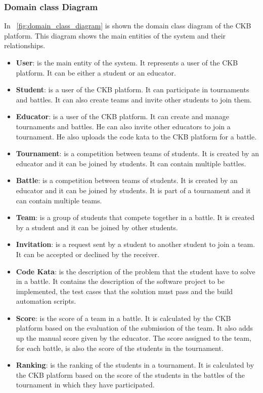 \subsubsection{Domain class Diagram}
In \figurename~\ref{fig:domain_class_diagram} is shown the domain class diagram of the CKB platform. This diagram shows the main entities of the system and their relationships.
\begin{itemize}
    \item \textbf{User}: is the main entity of the system. It represents a user of the CKB platform. It can be either a student or an educator.
    \item \textbf{Student}: is a user of the CKB platform. It can participate in tournaments and battles. It can also create teams and invite other students to join them.
    \item \textbf{Educator}: is a user of the CKB platform. It can create and manage tournaments and battles. He can also invite other educators to join a tournament. He also uploads the code kata to the CKB platform for a battle.
    \item \textbf{Tournament}: is a competition between teams of students. It is created by an educator and it can be joined by students. It can contain multiple battles.
    \item \textbf{Battle}: is a competition between teams of students. It is created by an educator and it can be joined by students. It is part of a tournament and it can contain multiple teams.
    \item \textbf{Team}: is a group of students that compete together in a battle. It is created by a student and it can be joined by other students.
    \item \textbf{Invitation}: is a request sent by a student to another student to join a team. It can be accepted or declined by the receiver.
    \item \textbf{Code Kata}: is the description of the problem that the student have to solve in a battle. It contains the description of the software project to be implemented, the test cases that the solution must pass and the build automation scripts.
    \item \textbf{Score}: is the score of a team in a battle. It is calculated by the CKB platform based on the evaluation of the submission of the team. It also adds up the manual score given by the educator. The score assigned to the team, for each battle, is also the score of the students in the tournament.
    \item \textbf{Ranking}: is the ranking of the students in a tournament. It is calculated by the CKB platform based on the score of the students in the battles of the tournament in which they have participated.

\end{itemize}
